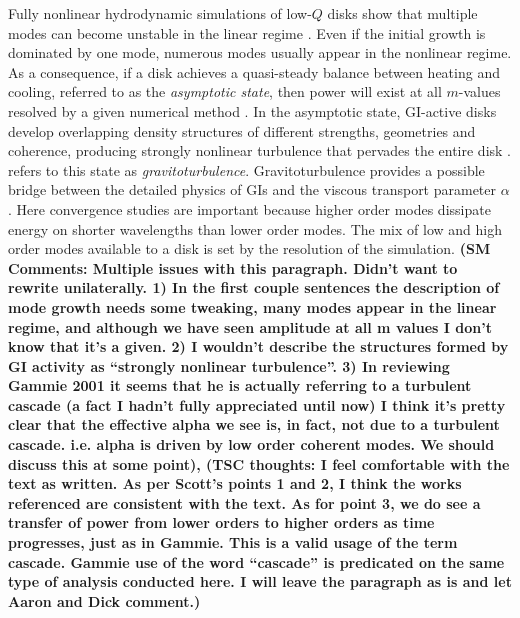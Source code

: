 \documentclass[manuscript]{aastex}
\begin{document}
Fully nonlinear hydrodynamic simulations of low-$Q$ disks show that multiple
modes can become unstable in the linear regime \citep{nelson1998, pickett1998, lodato2004,boley2006,cossins2009}.  Even if the initial growth is dominated by one mode, numerous modes usually appear in the nonlinear regime. As a consequence, if a disk achieves a quasi-steady balance between heating and cooling, referred to as the {\it asymptotic state},
then power will exist at all $m$-values resolved by a given numerical method \citep{mejia2005,boley2006}.  
In the asymptotic state, GI-active disks develop overlapping density structures of different strengths, geometries and coherence, producing strongly nonlinear turbulence that pervades the entire disk \citep[e.g.][]{pickett2003, mejia2005,boley2006}.
\citet{gammie2001} refers to this state as {\it gravitoturbulence}. Gravitoturbulence provides a possible bridge between the detailed physics of GIs and the viscous transport parameter $\alpha$.  Here convergence studies are important because 
higher order modes dissipate energy on shorter wavelengths than lower order modes.  The mix of low and high order modes available to a disk is set by the resolution of the simulation. {\bf (SM Comments: Multiple issues with this paragraph. Didn't want to rewrite unilaterally. 1) In the first couple sentences the description of mode growth needs some tweaking, many modes appear in the linear regime, and although we have seen amplitude at all m values I don't know that it's a given. 2) I wouldn't describe the structures formed by GI activity as ``strongly nonlinear turbulence''. 3) In reviewing Gammie 2001 it seems that he is actually referring to a turbulent cascade (a fact I hadn't fully appreciated until now) I think it's pretty clear that the effective alpha we see is, in fact, not due to a turbulent cascade. i.e. alpha is driven by low order coherent modes. We should discuss this at some point), (TSC thoughts: I feel comfortable with the text as written.  As per Scott's points 1 and 2, I think the works referenced are consistent with the text.  As for point 3, we do see a transfer of power from lower orders to higher orders as
time progresses, just as in Gammie.  This is a valid usage of the term cascade.  Gammie use of the word ``cascade'' is predicated on the same type of analysis conducted here.  I will leave the paragraph as is and let Aaron and Dick comment.)}
\end{document}
